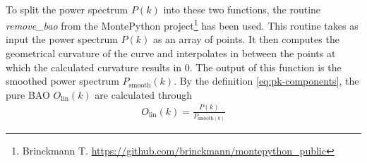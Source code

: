  \\
 To split the power spectrum $P(k)$ into these two functions, the routine \textit{remove\_bao} from the MontePython project\footnote{Brinckmann T. \url{https://github.com/brinckmann/montepython_public}} \cite{montepython} has been used. This routine takes as input the power spectrum $P(k)$ as an array of points. It then computes the geometrical curvature of the curve and interpolates in between the points at which the calculated curvature results in 0. The output of this function is the smoothed power spectrum $P_{\text{smooth}}(k)$. By the definition \eqref{eq:pk-components}, the pure BAO  $O_{\text{lin}}(k)$ are calculated through 
\begin{align}
	O_{\text{lin}}(k) = \frac{P(k)}{P_{\text{smooth}(k)}}
\end{align}

